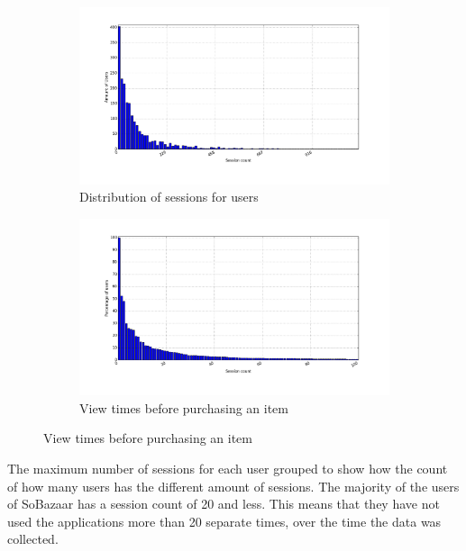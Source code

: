     \begin{figure}[H]
        \centering
        \begin{subfigure}{.5\textwidth}
            \centering
            \includegraphics[width=\dualGraphWidth]{image/sessionsCountdistribution.png}
            \caption{Distribution of sessions for users}
    \label{figure:sessCountDist}
        \end{subfigure}%
        \begin{subfigure}{.5\textwidth}
            \centering
            \includegraphics[width=\dualGraphWidth]{image/sessioncumdistribution.png}
            \caption{View times before purchasing an item}
    \label{figure:sessCountCumDist}
        \end{subfigure}
    \end{figure}
        The maximum number of sessions for each user grouped to show how the count of how many users has the different amount of sessions.
        The majority of the users of SoBazaar has a session count of 20 and less.
        This means that they have not used the applications more than 20 separate times, over the time the data was collected.

